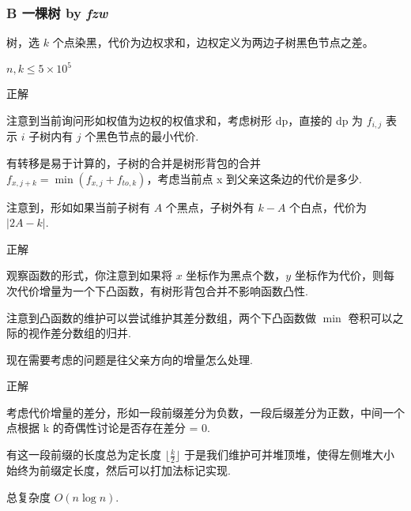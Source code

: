 \frame
{
  \frametitle{B 一棵树 {by \itshape fzw}}

	树，选 $k$ 个点染黑，代价为边权求和，边权定义为两边子树黑色节点之差。
	
	$n,k\le 5\times 10^5$
}

\begin{frame}{正解}

	注意到当前询问形如权值为边权的权值求和，考虑树形 dp，直接的 dp 为 $f_{i,j}$ 表示 $i$ 子树内有 $j$ 个黑色节点的最小代价. \pause

	有转移是易于计算的，子树的合并是树形背包的合并 $f_{x,j+k}=\min(f_{x,j}+f_{to,k})$，考虑当前点 x 到父亲这条边的代价是多少. \pause

	注意到，形如如果当前子树有 $A$ 个黑点，子树外有 $k-A$ 个白点，代价为 $|2A-k|$.

\end{frame}

\begin{frame}{正解}

	观察函数的形式，你注意到如果将 $x$ 坐标作为黑点个数，$y$ 坐标作为代价，则每次代价增量为一个下凸函数，有树形背包合并不影响函数凸性. \pause

	注意到凸函数的维护可以尝试维护其差分数组，两个下凸函数做 $\min$ 卷积可以之际的视作差分数组的归并. \pause

	现在需要考虑的问题是往父亲方向的增量怎么处理.

\end{frame}

\begin{frame}{正解}

	考虑代价增量的差分，形如一段前缀差分为负数，一段后缀差分为正数，中间一个点根据 k 的奇偶性讨论是否存在差分 = 0. \pause

	有这一段前缀的长度总为定长度 $\lfloor \frac k 2 \rfloor$ 于是我们维护可并堆顶堆，使得左侧堆大小始终为前缀定长度，然后可以打加法标记实现. \pause

	总复杂度 $O(n\log n)$.

\end{frame}
